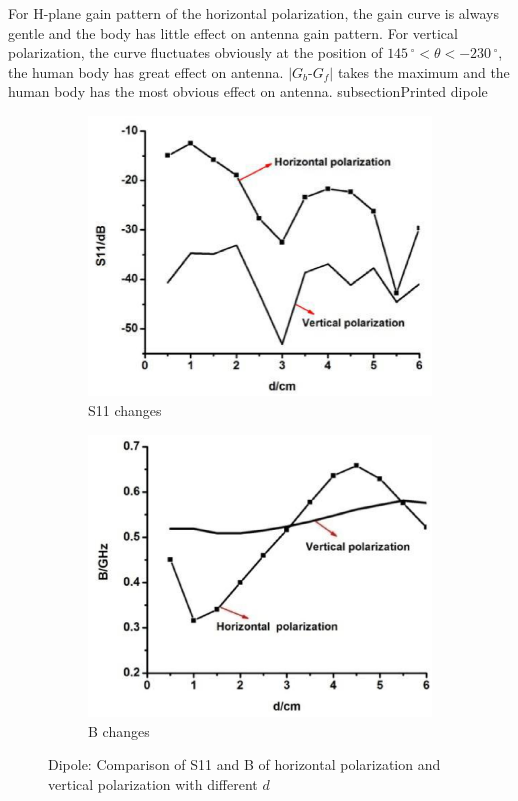 \documentclass[journal]{IEEEtran}
\begin{document}
For H-plane gain pattern of the horizontal polarization, the gain curve is always gentle and the body has little effect on
antenna gain pattern. For vertical polarization, the curve fluctuates obviously at the position of
$145\,^{\circ}$$<$$\theta$$<$$-230\,^{\circ}$, the human body has great effect on antenna.
$\mid$$G_{b}$-$G_{f}$$\mid$ takes the maximum and the human body has the most obvious effect on antenna.
subsection{Printed dipole}
\begin{figure}[!htb]
\centering
\begin{subfigure}[b]{0.4\textwidth}
\includegraphics[width=\textwidth]{figs/11a.eps}
\caption{S11 changes}
\label{fig:11a}	
\end{subfigure}		
\begin{subfigure}[b]{0.4\textwidth}
\includegraphics[width=\textwidth]{figs/11b.eps}
\caption{B changes}
\label{fig:11b}
\end{subfigure}
\caption{Dipole: Comparison of S11 and B of horizontal polarization and vertical polarization with different $d$}
\label{fig:11}
\end{figure}
\end{document}
